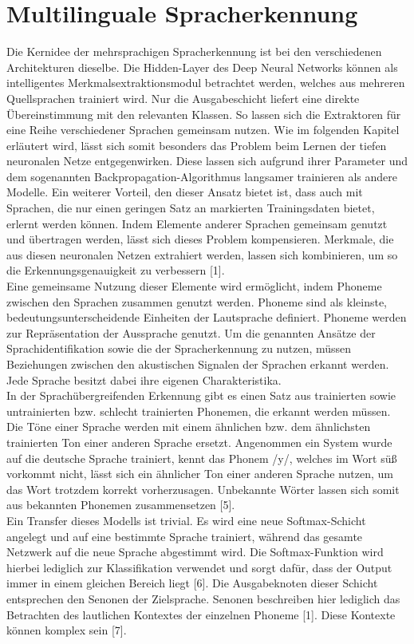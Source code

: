 \section{Multilinguale Spracherkennung}
Die Kernidee der mehrsprachigen Spracherkennung ist bei den verschiedenen Architekturen dieselbe. Die Hidden-Layer des Deep Neural Networks können als intelligentes Merkmalsextraktionsmodul betrachtet werden, welches aus mehreren Quellsprachen trainiert wird. Nur die Ausgabeschicht liefert eine direkte Übereinstimmung mit den relevanten Klassen. So lassen sich die Extraktoren für eine Reihe verschiedener Sprachen gemeinsam nutzen. 
Wie im folgenden Kapitel erläutert wird, lässt sich somit besonders das Problem beim Lernen der tiefen neuronalen Netze entgegenwirken. Diese lassen sich aufgrund ihrer Parameter und dem sogenannten Backpropagation-Algorithmus langsamer trainieren als andere Modelle. Ein weiterer Vorteil, den dieser Ansatz bietet ist, dass auch mit Sprachen, die nur einen geringen Satz an markierten Trainingsdaten bietet, erlernt werden können. Indem Elemente anderer Sprachen gemeinsam genutzt und übertragen werden, lässt sich dieses Problem kompensieren. Merkmale, die aus diesen neuronalen Netzen extrahiert werden, lassen sich kombinieren, um so die Erkennungsgenauigkeit zu verbessern [1].
\\
Eine gemeinsame Nutzung dieser Elemente wird ermöglicht, indem Phoneme zwischen den Sprachen zusammen genutzt werden. Phoneme sind als kleinste, bedeutungsunterscheidende Einheiten der Lautsprache definiert. Phoneme werden zur Repräsentation der Aussprache genutzt. Um die genannten Ansätze der Sprachidentifikation sowie die der Spracherkennung zu nutzen, müssen Beziehungen zwischen den akustischen Signalen der Sprachen erkannt werden. Jede Sprache besitzt dabei ihre eigenen Charakteristika. 
\\
In der Sprachübergreifenden Erkennung gibt es einen Satz aus trainierten sowie untrainierten bzw. schlecht trainierten Phonemen, die erkannt werden müssen. Die Töne einer Sprache werden mit einem ähnlichen bzw. dem ähnlichsten trainierten Ton einer anderen Sprache ersetzt. Angenommen ein System wurde auf die deutsche Sprache trainiert, kennt das Phonem /y/, welches im Wort süß vorkommt nicht, lässt sich ein ähnlicher Ton einer anderen Sprache nutzen, um das Wort trotzdem korrekt vorherzusagen. Unbekannte Wörter lassen sich somit aus bekannten Phonemen zusammensetzen [5]. 
\\
Ein Transfer dieses Modells ist trivial. Es wird eine neue Softmax-Schicht angelegt und auf eine bestimmte Sprache trainiert, während das gesamte Netzwerk auf die neue Sprache abgestimmt wird. Die Softmax-Funktion wird hierbei lediglich zur Klassifikation verwendet und sorgt dafür, dass der Output immer in einem gleichen Bereich liegt [6]. Die Ausgabeknoten dieser Schicht entsprechen den Senonen der Zielsprache. Senonen beschreiben hier lediglich das Betrachten des lautlichen Kontextes der einzelnen Phoneme [1]. Diese Kontexte können komplex sein [7].
